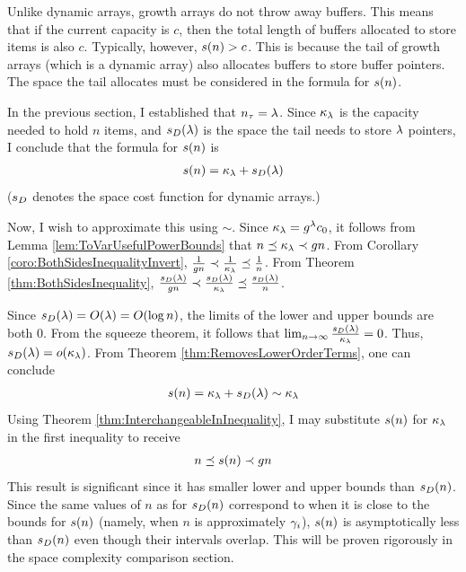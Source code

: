 \HdrSpaceComplex

Unlike dynamic arrays, growth arrays do not throw away buffers. This means that if the current capacity is $c$, then the total length of buffers allocated to store items is also $c$. Typically, however, $s(n) > c$. This is because the tail of growth arrays (which is a dynamic array) also allocates buffers to store buffer pointers. The space the tail allocates must be considered in the formula for $s(n)$.

In the previous section, I established that $n_\tau = \lambda$. Since $\kappa_\lambda$ is the capacity needed to hold $n$ items, and $s_D(\lambda)$ is the space the tail needs to store $\lambda$ pointers, I conclude that the formula for $s(n)$ is
\begin{align*}
s(n) = \kappa_\lambda + s_D(\lambda)
\end{align*}
($s_D$ denotes the space cost function for dynamic arrays.)

Now, I wish to approximate this using $\sim$. Since $\kappa_\lambda = g^\lambda c_0$, it follows from Lemma \ref{lem:ToVarUsefulPowerBounds} that $n \preceq \kappa_\lambda \prec g{n}$. From Corollary \ref{coro:BothSidesInequalityInvert}, $\frac{1}{g n} \prec \frac{1}{\kappa_\lambda} \preceq \frac{1}{n}$. From Theorem \ref{thm:BothSidesInequality}, $\frac{s_D(\lambda)}{g n} \prec \frac{s_D(\lambda)}{\kappa_\lambda} \preceq \frac{s_D(\lambda)}{n}$.

Since $s_D(\lambda) = O(\lambda) = O(\log n)$, the limits of the lower and upper bounds are both $0$. From the squeeze theorem, it follows that $\lim_{n \to \infty} \frac{s_D(\lambda)}{\kappa_\lambda} = 0$. Thus, $s_D(\lambda) = o(\kappa_\lambda)$. From Theorem \ref{thm:RemovesLowerOrderTerms}, one can conclude
\begin{align*}
s(n) = \kappa_\lambda + s_D(\lambda) \sim \kappa_\lambda
\end{align*}
Using Theorem \ref{thm:InterchangeableInInequality}, I may substitute $s(n)$ for $\kappa_\lambda$ in the first inequality to receive
\begin{align*}
n \preceq s(n) \prec g{n}
\end{align*}
This result is significant since it has smaller lower and upper bounds than $s_D(n)$. Since the same values of $n$ as for $s_D(n)$ correspond to when it is close to the bounds for $s(n)$ (namely, when $n$ is approximately $\gamma_i$), $s(n)$ is asymptotically less than $s_D(n)$ even though their intervals overlap. This will be proven rigorously in the space complexity comparison section.
